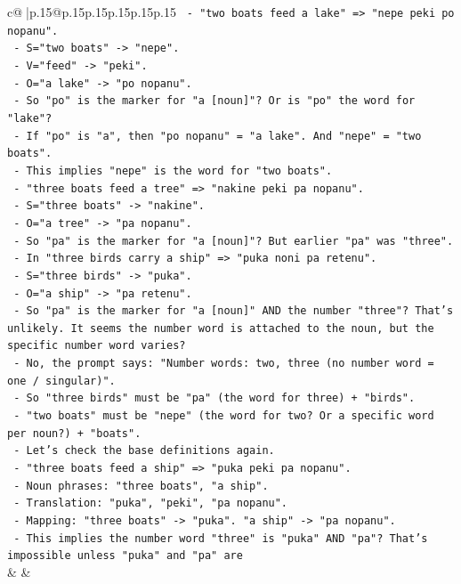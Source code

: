 \documentclass{article}
\begin{document}
{\begin{supertabular}{c@{$\;$}|p{.15\linewidth}@{}p{.15\linewidth}p{.15\linewidth}p{.15\linewidth}p{.15\linewidth}p{.15\linewidth}}
{{{\texttt{    {-} "two boats feed a lake" => "nepe peki po nopanu".} \\
\texttt{      {-} S="two boats" {-}> "nepe".} \\
\texttt{      {-} V="feed" {-}> "peki".} \\
\texttt{      {-} O="a lake" {-}> "po nopanu".} \\
\texttt{      {-} So "po" is the marker for "a {[}noun{]}"? Or is "po" the word for "lake"?} \\
\texttt{      {-} If "po" is "a", then "po nopanu" = "a lake". And "nepe" = "two boats".} \\
\texttt{      {-} This implies "nepe" is the word for "two boats".} \\
\texttt{    {-} "three boats feed a tree" => "nakine peki pa nopanu".} \\
\texttt{      {-} S="three boats" {-}> "nakine".} \\
\texttt{      {-} O="a tree" {-}> "pa nopanu".} \\
\texttt{      {-} So "pa" is the marker for "a {[}noun{]}"? But earlier "pa" was "three".} \\
\texttt{      {-} In "three birds carry a ship" => "puka noni pa retenu".} \\
\texttt{      {-} S="three birds" {-}> "puka".} \\
\texttt{      {-} O="a ship" {-}> "pa retenu".} \\
\texttt{      {-} So "pa" is the marker for "a {[}noun{]}" AND the number "three"? That's unlikely. It seems the number word is attached to the noun, but the specific number word varies?} \\
\texttt{      {-} No, the prompt says: "Number words: two, three (no number word = one / singular)".} \\
\texttt{      {-} So "three birds" must be "pa" (the word for three) + "birds".} \\
\texttt{      {-} "two boats" must be "nepe" (the word for two? Or a specific word per noun?) + "boats".} \\
\texttt{      {-} Let's check the base definitions again.} \\
\texttt{      {-} "three boats feed a ship" => "puka peki pa nopanu".} \\
\texttt{        {-} Noun phrases: "three boats", "a ship".} \\
\texttt{        {-} Translation: "puka", "peki", "pa nopanu".} \\
\texttt{        {-} Mapping: "three boats" {-}> "puka". "a ship" {-}> "pa nopanu".} \\
\texttt{        {-} This implies the number word "three" is "puka" AND "pa"? That's impossible unless "puka" and "pa" are} \\
            }
        }
    }
    & & \\ \\


\end{supertabular}}
\end{document}
